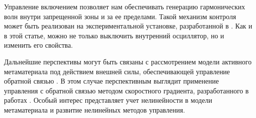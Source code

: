 Управление включением позволяет нам обеспечивать генерацию гармонических волн внутри запрещенной зоны и за ее пределами. Такой механизм контроля может быть реализован на экспериментальной установке, разработанной в \cite{Yang}. Как и в этой статье, можно не только выключить внутренний осциллятор, но и изменить его свойства.

Дальнейшие перспективы могут быть связаны с рассмотрением модели активного метаматериала под действием внешней силы, обеспечивающей управление обратной связью \cite{Pope2012, Pope2014}. В этом случае перспективным выглядит применение управления с обратной связью методом скоростного градиента, разработанного в работах \cite{bound_fradkov, porant16}. Особый интерес представляет учет нелинейности в модели метаматериала и развитие нелинейных методов управления.